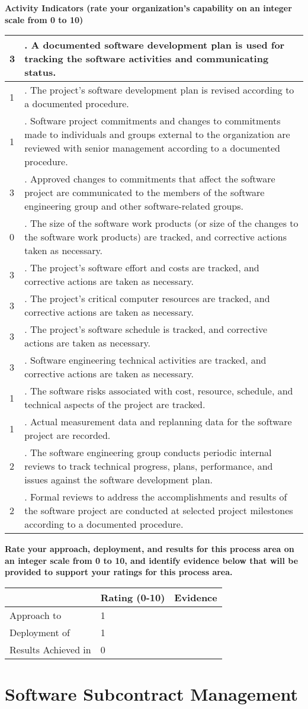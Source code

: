 \documentclass{article}
\newcommand{\KPAname}{}
\newenvironment{KPARate}[1]
	{\renewcommand{\KPAname}{#1}
	 {\bf Rate your approach, deployment, and results for
	  this process area on an integer scale from 0 to 10, and 
	  identify evidence below that will be provided to support your
	  ratings for this process area.}
	 \begin{center}
	 \begin{tabular}{|p{1.0in}|p{0.5in}|p{5.0in}|} \hline
	 & Rating (0-10) & \multicolumn{1}{c|}{Evidence} \\ \hline}
	{\end{tabular}
	 \end{center}}
\newcommand{\Approach}[2]{Approach to \KPAname & #1 & #2 \\ \hline}
\newcommand{\Deployment}[2]{Deployment of \KPAname & #1 & #2 \\ \hline}
\newcommand{\Results}[2]{Results Achieved in \KPAname & #1 & #2 \\
	\hline}
\newcounter{activity}
\newenvironment{KPAActivity}
	{
	 \setcounter{activity}{0}
	 {\bf Activity Indicators (rate your organization's capability
	 on an integer scale from 0 to 10)}
	 \begin{center}
	 \begin{tabular}{|p{0.5in}|p{6.0in}|} \hline
	}
	{
	 \end{tabular}
	 \end{center}
	}
\newcommand{\Activity}[2]{\stepcounter{activity} #1 &
\arabic{activity}. #2 \\ \hline}
\begin{document}
\begin{KPAActivity}
\Activity{3}{A documented software development plan is used for
tracking the software activities and communicating status.}
\Activity{1}{The project's software development plan is revised
according to a documented procedure.}
\Activity{1}{Software project commitments and changes to
commitments made to individuals and groups external to the
organization are reviewed with senior management according to a
documented procedure.}
\Activity{3}{Approved changes to commitments that affect the
software project are communicated to the members of the software
engineering group and other software-related groups.}
\Activity{0}{The size of the software work products (or size of the
changes to the software work products) are tracked, and corrective
actions taken as necessary.}
\Activity{3}{The project's software effort and costs are tracked,
and corrective actions are taken as necessary.}
\Activity{3}{The project's critical computer resources are tracked,
and corrective actions are taken as necessary.}
\Activity{3}{The project's software schedule is tracked, and
corrective actions are taken as necessary.}
\Activity{3}{Software engineering technical activities are tracked,
and corrective actions are taken as necessary.}
\Activity{1}{The software risks associated with cost, resource,
schedule, and technical aspects of the project are tracked.}
\Activity{1}{Actual measurement data and replanning data for the
software project are recorded.}
\Activity{2}{The software engineering group conducts periodic
internal reviews to track technical progress, plans, performance, and
issues against the software development plan.}
\Activity{2}{Formal reviews to address the accomplishments and
results of the software project are conducted at selected project
milestones according to a documented procedure.} 
\end{KPAActivity}

\begin{KPARate}{Software Project Tracking and Oversight}
\Approach{1}{}
\Deployment{1}{}
\Results{0}{}
\end{KPARate}

\newpage
\section{Software Subcontract Management}
\end{document}
